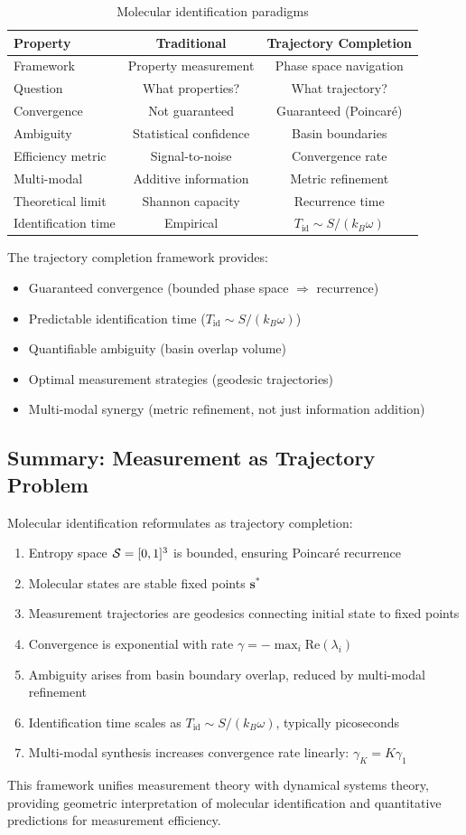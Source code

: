 \begin{table}[H]
\centering
\caption{Molecular identification paradigms}
\label{tab:identification_paradigms}
\begin{tabular}{lcc}
\toprule
\textbf{Property} & \textbf{Traditional} & \textbf{Trajectory Completion} \\
\midrule
Framework & Property measurement & Phase space navigation \\
Question & What properties? & What trajectory? \\
Convergence & Not guaranteed & Guaranteed (Poincaré) \\
Ambiguity & Statistical confidence & Basin boundaries \\
Efficiency metric & Signal-to-noise & Convergence rate \\
Multi-modal & Additive information & Metric refinement \\
Theoretical limit & Shannon capacity & Recurrence time \\
Identification time & Empirical & $T_{\text{id}} \sim S/(k_B\omega)$ \\
\bottomrule
\end{tabular}
\end{table}

The trajectory completion framework provides:
\begin{itemize}
\item Guaranteed convergence (bounded phase space $\Rightarrow$ recurrence)
\item Predictable identification time ($T_{\text{id}} \sim S/(k_B\omega)$)
\item Quantifiable ambiguity (basin overlap volume)
\item Optimal measurement strategies (geodesic trajectories)
\item Multi-modal synergy (metric refinement, not just information addition)
\end{itemize}

\subsection{Summary: Measurement as Trajectory Problem}

Molecular identification reformulates as trajectory completion:
\begin{enumerate}
\item Entropy space $\mathcal{S} = [0,1]^3$ is bounded, ensuring Poincaré recurrence
\item Molecular states are stable fixed points $\mathbf{s}^*$
\item Measurement trajectories are geodesics connecting initial state to fixed points
\item Convergence is exponential with rate $\gamma = -\max_i \text{Re}(\lambda_i)$
\item Ambiguity arises from basin boundary overlap, reduced by multi-modal refinement
\item Identification time scales as $T_{\text{id}} \sim S/(k_B\omega)$, typically picoseconds
\item Multi-modal synthesis increases convergence rate linearly: $\gamma_K = K\gamma_1$
\end{enumerate}

This framework unifies measurement theory with dynamical systems theory, providing geometric interpretation of molecular identification and quantitative predictions for measurement efficiency.
